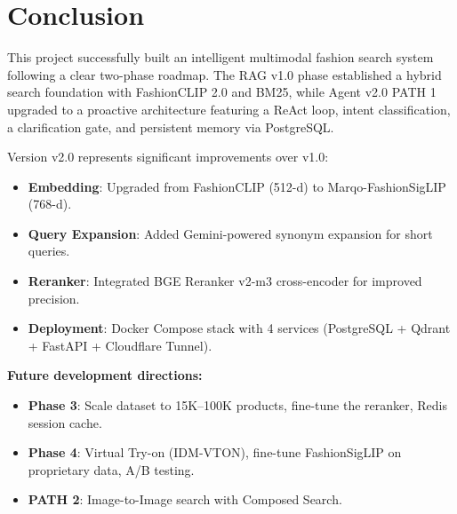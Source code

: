 \documentclass[12pt, twoside]{report}
\renewcommand{\bibname}{References}
\begin{document}
\section{Conclusion}
This project successfully built an intelligent multimodal fashion search system following a clear two-phase roadmap. The RAG v1.0 phase established a hybrid search foundation with FashionCLIP 2.0 and BM25, while Agent v2.0 PATH 1 upgraded to a proactive architecture featuring a ReAct loop, intent classification, a clarification gate, and persistent memory via PostgreSQL.

Version v2.0 represents significant improvements over v1.0:
\begin{itemize}
    \item \textbf{Embedding}: Upgraded from FashionCLIP (512-d) to Marqo-FashionSigLIP (768-d).
    \item \textbf{Query Expansion}: Added Gemini-powered synonym expansion for short queries.
    \item \textbf{Reranker}: Integrated BGE Reranker v2-m3 cross-encoder for improved precision.
    \item \textbf{Deployment}: Docker Compose stack with 4 services (PostgreSQL + Qdrant + FastAPI + Cloudflare Tunnel).
\end{itemize}

\textbf{Future development directions:}
\begin{itemize}
    \item \textbf{Phase 3}: Scale dataset to 15K--100K products, fine-tune the reranker, Redis session cache.
    \item \textbf{Phase 4}: Virtual Try-on (IDM-VTON), fine-tune FashionSigLIP on proprietary data, A/B testing.
    \item \textbf{PATH 2}: Image-to-Image search with Composed Search.
\end{itemize}

\renewcommand{\bibname}{References}
\end{document}
